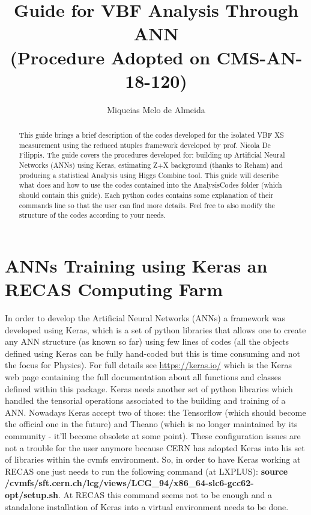 \documentclass[]{report}
\title{\textbf{Guide for VBF Analysis Through ANN}\\
	(Procedure Adopted on CMS-AN-18-120)}
\author{Miqueias Melo de Almeida}
\begin{document}
\maketitle

\begin{abstract}
This guide brings a brief description of the codes developed for the isolated VBF XS measurement using the reduced ntuples framework developed by prof. Nicola De Filippis. The guide covers the procedures developed for: building up Artificial Neural Networks (ANNs) using Keras, estimating Z+X background (thanks to Reham) and producing a statistical Analysis using Higgs Combine tool. This guide will describe what does and how to use the codes contained into the AnalysisCodes folder (which should contain this guide). Each python codes contains some explanation of their commands line so that the user can find more details. Feel free to also modify the structure of the codes according to your needs.
\end{abstract}

\section{ANNs Training using Keras an RECAS Computing Farm}
In order to develop the Artificial Neural Networks (ANNs) a framework was developed using Keras, which is a set of python libraries that allows one to create any ANN structure (as known so far) using few lines of codes (all the objects defined using Keras can be fully hand-coded but this is time consuming and not the focus for Physics). For full details see \url{https://keras.io/} which is the Keras web page containing the full documentation about all functions and classes defined within this package. Keras needs another set of python libraries which handled the tensorial operations associated to the building and training of a ANN. Nowadays Keras accept two of those: the Tensorflow (which should become the official one in the future) and Theano (which is no longer maintained by its community - it'll become obsolete at some point). These configuration issues are not a trouble for the user anymore because CERN has adopted Keras into his set of libraries within the cvmfs environment. So, in order to have Keras working at RECAS one just needs to run the following command (at LXPLUS): \textbf{source /cvmfs/sft.cern.ch/lcg/views/LCG\_94/x86\_64-slc6-gcc62-opt/setup.sh}. At RECAS this command seems not to be enough and a standalone installation of Keras into a virtual environment needs to be done.
\end{document}
